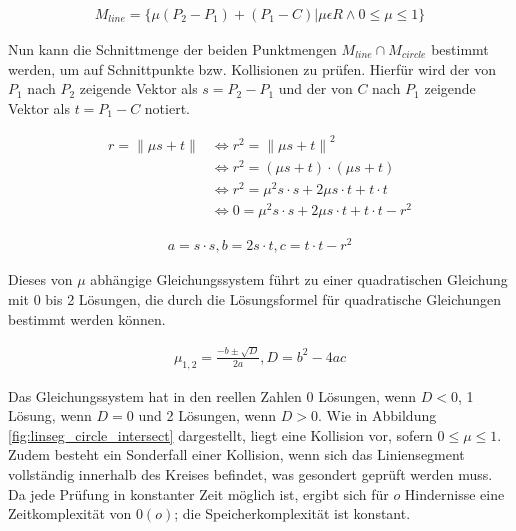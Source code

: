 \begin{equation}
\begin{aligned}
M_{line} = \{ \mu (P_2 - P_1) + (P_1 - C) | \mu \epsilon R \land 0 \le \mu \le 1 \}
\end{aligned}
\end{equation}

Nun kann die Schnittmenge der beiden Punktmengen $M_{line} \cap M_{circle}$
bestimmt werden, um auf Schnittpunkte bzw. Kollisionen zu prüfen. Hierfür wird
der von $P_1$ nach $P_2$ zeigende Vektor als $s = P_2 - P_1$ und der von
$C$ nach $P_1$ zeigende Vektor als $t = P_1 - C$ notiert.

\begin{equation}
\begin{aligned}
r = {\lVert \mu s + t \rVert} &\iff r^2 = {\lVert \mu s + t \rVert}^2\\
&\iff r^2 = (\mu s + t) \cdot (\mu s + t)\\
&\iff r^2 = \mu^2 s \cdot s + 2 \mu s \cdot t + t \cdot t\\
&\iff 0 = \mu^2 s \cdot s + 2 \mu s \cdot t + t \cdot t - r^2
\end{aligned}
\end{equation}

\begin{equation}
\begin{aligned}
a = s \cdot s, b = 2 s \cdot t, c = t \cdot t - r^2
\end{aligned}
\end{equation}

Dieses von $\mu$ abhängige Gleichungssystem führt zu einer quadratischen Gleichung
mit 0 bis 2 Lösungen, die durch die Lösungsformel für quadratische Gleichungen
bestimmt werden können.

\begin{equation}
\begin{aligned}
\mu_{1,2} = \frac{-b \pm \sqrt{D}}{2 a}, D = b^2 - 4 a c
\end{aligned}
\end{equation}

Das Gleichungssystem hat in den reellen Zahlen 0 Lösungen, wenn $D < 0$,
1 Lösung, wenn $D = 0$ und 2 Lösungen, wenn $D > 0$. Wie in Abbildung
\ref{fig:linseg_circle_intersect} dargestellt, liegt eine Kollision vor,
sofern $0 \le \mu \le 1$. Zudem besteht ein Sonderfall
einer Kollision, wenn sich das Liniensegment vollständig innerhalb des Kreises
befindet, was gesondert geprüft werden muss. Da jede Prüfung in konstanter Zeit
möglich ist, ergibt sich für $o$ Hindernisse eine Zeitkomplexität von $0(o)$;
die Speicherkomplexität ist konstant.

